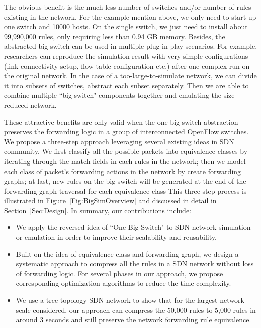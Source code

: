 The obvious benefit is the much less number of switches and/or number of rules existing in the network.
For the example mention above, we only need to start up one switch and 10000 hosts.
On the single switch, we just need to install about 99,990,000 rules, only requiring less than 0.94 GB memory.
Besides, the abstracted big switch can be used in multiple plug-in-play scenarios.
For example, researchers can reproduce the simulation result with very
simple configurations (link connectivity setup, flow table configuration etc.)
after one complex run on the original network.
In the case of a too-large-to-simulate network, we can divide it into subsets of switches,
abstract each subset separately.
Then we are able to combine multiple ``big switch" components together
and emulating the size-reduced network.

These attractive benefits are only valid when the one-big-switch abstraction preserves
the forwarding logic in a group of interconnected OpenFlow switches.
We propose a three-step approach leveraging several existing ideas in SDN community.
We first classify all the possible packets into equivalence classes by iterating through
the match fields in each rules in the network;
then we model each class of packet's forwarding actions in the network
by create forwarding graphs;
at last, new rules on the big switch will be generated at the end of the 
forwarding graph traversal for each equivalence class
This three-step process is illustrated in Figure~\ref{Fig:BigSimOverview} and discussed
in detail in Section~\ref{Sec:Design}.
In summary, our contributions include:
\begin{itemize}
\item We apply the reversed idea of ``One Big Switch"\cite{OneBigSwitchAbstraction}
        to SDN network simulation or emulation in order to
        improve their scalability and reusability.
\item Built on the idea of equivalence class and forwarding graph, we design
        a systematic approach to compress all the rules in a SDN network without
        loss of forwarding logic.
        For several phases in our approach, we propose corresponding optimization
        algorithms to reduce the time complexity.
\item We use a tree-topology SDN network to show that for the largest network scale
        considered, our approach can compress the 50,000 rules to 5,000 rules in
        around 3 seconds and still preserve the network forwarding rule equivalence.
\end{itemize}

